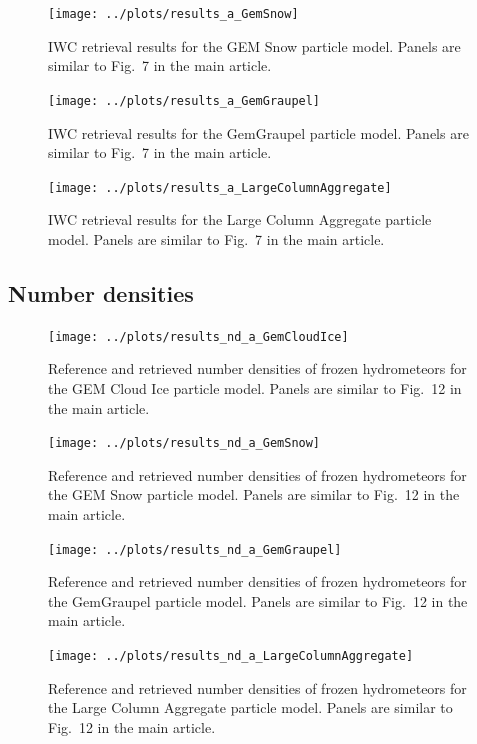 \documentclass[journal abbreviation, manuscript]{copernicus}
\begin{document}
\begin{figure}[!hbpt]
\centering
\texttt{[image: ../plots/results\_a\_GemSnow]}
\caption{IWC retrieval results for the GEM Snow particle model. Panels are similar to
  Fig.~7 in the main article.}
\end{figure}

\begin{figure}[!hbpt]
\centering
\texttt{[image: ../plots/results\_a\_GemGraupel]}
\caption{IWC retrieval results for the GemGraupel particle model. Panels are similar to
  Fig.~7 in the main article.}
\end{figure}

\begin{figure}[!hbpt]
\centering
\texttt{[image: ../plots/results\_a\_LargeColumnAggregate]}
\caption{IWC retrieval results for the Large Column Aggregate particle model. Panels are similar to
  Fig.~7 in the main article.}
\end{figure}

\subsection{Number densities}

\begin{figure}[!hbpt]
\centering
\texttt{[image: ../plots/results\_nd\_a\_GemCloudIce]}
\caption{Reference and retrieved number densities of frozen hydrometeors for the
  GEM Cloud Ice particle model. Panels are similar to Fig.~12 in the main article.}
\end{figure}

\begin{figure}[!hbpt]
\centering
\texttt{[image: ../plots/results\_nd\_a\_GemSnow]}
\caption{Reference and retrieved number densities of frozen hydrometeors for the
  GEM Snow particle model. Panels are similar to Fig.~12 in the main article.}
\end{figure}

\begin{figure}[!hbpt]
\centering
\texttt{[image: ../plots/results\_nd\_a\_GemGraupel]}
\caption{Reference and retrieved number densities of frozen hydrometeors for the
  GemGraupel particle model. Panels are similar to Fig.~12 in the main article.}
\end{figure}

\begin{figure}[!hbpt]
\centering
\texttt{[image: ../plots/results\_nd\_a\_LargeColumnAggregate]}
\caption{Reference and retrieved number densities of frozen hydrometeors for the
  Large Column Aggregate particle model. Panels are similar to Fig.~12 in the main article.}
\end{figure}
\end{document}
